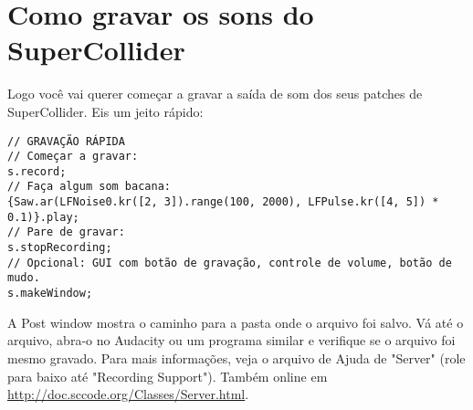 \section{Como gravar os sons do SuperCollider}

Logo você vai querer começar a gravar a saída de som dos seus patches de SuperCollider. Eis um jeito rápido:
 
\begin{lstlisting}[style=SuperCollider-IDE, basicstyle=\scttfamily\footnotesize]
// GRAVAÇÃO RÁPIDA
// Começar a gravar:
s.record;
// Faça algum som bacana:
{Saw.ar(LFNoise0.kr([2, 3]).range(100, 2000), LFPulse.kr([4, 5]) * 0.1)}.play;
// Pare de gravar:
s.stopRecording;
// Opcional: GUI com botão de gravação, controle de volume, botão de mudo.
s.makeWindow;
\end{lstlisting}
 
A Post window mostra o caminho para a pasta onde o arquivo foi salvo. Vá até o arquivo, abra-o no Audacity ou um programa similar e verifique se o arquivo foi mesmo gravado. Para mais informações, veja o arquivo de Ajuda de "Server" (role para baixo até "Recording Support"). Também online em \url{http://doc.sccode.org/Classes/Server.html}.
